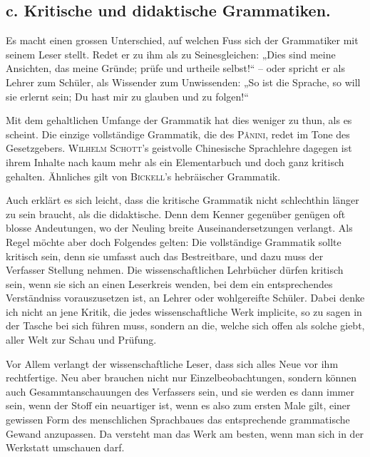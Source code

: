 \subsection*{c. Kritische und didaktische Grammatiken.}

Es macht einen grossen Unterschied, auf welchen Fuss sich der Grammatiker mit seinem Leser stellt. Redet er zu ihm als zu Seinesgleichen: „Dies sind meine Ansichten, das meine Gründe; prüfe und urtheile selbst!“ – oder spricht er als Lehrer zum Schüler, als Wissender \label{fp.119} zum Unwissenden: „So ist die Sprache, so will sie erlernt sein; Du hast mir zu glauben und zu folgen!“

Mit dem gehaltlichen Umfange der Grammatik hat dies weniger zu thun, als es scheint. Die einzige vollständige Grammatik, die des \textsc{Pânini}, redet im Tone des Gesetzgebers. \textsc{Wilhelm Schott}’s geistvolle Chinesische Sprachlehre dagegen ist ihrem Inhalte nach kaum mehr als ein Elementarbuch und doch ganz kritisch gehalten. Ähnliches gilt von  \textsc{Bickell}’s hebräischer Grammatik.

Auch erklärt es sich leicht, dass die kritische Grammatik nicht schlechthin länger zu sein braucht, als die didaktische. Denn dem Kenner gegenüber genügen oft blosse Andeutungen, wo der Neuling breite Auseinandersetzungen verlangt. Als Regel möchte aber doch Folgendes gelten: Die vollständige Grammatik sollte kritisch sein, denn sie umfasst auch das Bestreitbare, und dazu muss der Verfasser Stellung nehmen. Die wissenschaftlichen Lehrbücher dürfen kritisch sein, wenn sie sich an einen Leserkreis wenden, bei dem ein entsprechendes Verständniss vorauszusetzen ist, an Lehrer oder wohlgereifte Schüler. Dabei denke ich nicht an jene Kritik, die jedes wissenschaftliche Werk implicite, so zu sagen in der Tasche bei sich führen muss, sondern an die, welche sich offen als solche giebt, aller Welt zur Schau und Prüfung.

Vor Allem verlangt der wissenschaftliche Leser, dass sich alles Neue vor ihm rechtfertige. Neu aber brauchen nicht nur Einzelbeobachtungen, sondern können auch Gesammtanschauungen des Verfassers sein, und sie werden es dann immer sein, wenn der Stoff ein neuartiger ist, wenn es also zum ersten Male gilt, einer gewissen Form des menschlichen Sprachbaues das entsprechende \label{sp.114} grammatische Gewand anzupassen. Da versteht man das Werk am besten, wenn man sich in der Werkstatt umschauen darf.

